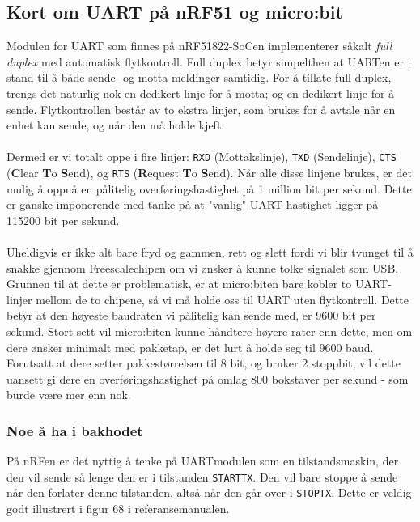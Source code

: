 \documentclass[11pt,a4paper]{article}
\begin{document}
\subsection{Kort om UART på nRF51 og micro:bit}
Modulen for UART som finnes på nRF51822-SoCen implementerer såkalt \textit{full duplex} med automatisk flytkontroll. Full duplex betyr simpelthen at UARTen er i stand til å både sende- og motta meldinger samtidig. For å tillate full duplex, trengs det naturlig nok en dedikert linje for å motta; og en dedikert linje for å sende. Flytkontrollen består av to ekstra linjer, som brukes for å avtale når en enhet kan sende, og når den må holde kjeft.\\
\\
Dermed er vi totalt oppe i fire linjer: \texttt{RXD} (Mottakslinje), \texttt{TXD} (Sendelinje), \texttt{CTS} (\textbf{C}lear \textbf{T}o \textbf{S}end), og \texttt{RTS} (\textbf{R}equest \textbf{T}o \textbf{S}end). Når alle disse linjene brukes, er det mulig å oppnå en pålitelig overføringshastighet på 1 million bit per sekund. Dette er ganske imponerende med tanke på at "vanlig" UART-hastighet ligger på 115200 bit per sekund.\\
\\
Uheldigvis er ikke alt bare fryd og gammen, rett og slett fordi vi blir tvunget til å snakke gjennom Freescalechipen om vi ønsker å kunne tolke signalet som USB. Grunnen til at dette er problematisk, er at micro:biten bare kobler to UART-linjer mellom de to chipene, så vi må holde oss til UART uten flytkontroll. Dette betyr at den høyeste baudraten vi pålitelig kan sende med, er 9600 bit per sekund. Stort sett vil micro:biten kunne håndtere høyere rater enn dette, men om dere ønsker minimalt med pakketap, er det lurt å holde seg til 9600 baud. Forutsatt at dere setter pakkestørrelsen til 8 bit, og bruker 2 stoppbit, vil dette uansett gi dere en overføringshastighet på omlag 800 bokstaver per sekund - som burde være mer enn nok.

\subsubsection{Noe å ha i bakhodet}
På nRFen er det nyttig å tenke på UARTmodulen som en tilstandsmaskin, der den vil sende så lenge den er i tilstanden \texttt{STARTTX}. Den vil bare stoppe å sende når den forlater denne tilstanden, altså når den går over i \texttt{STOPTX}. Dette er veldig godt illustrert i figur 68 i referansemanualen.
\end{document}
